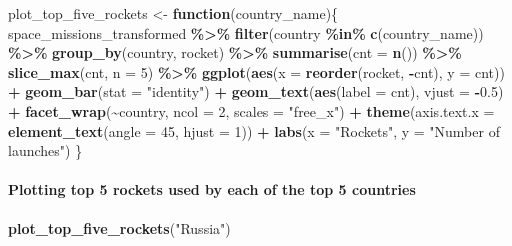 \documentclass[
]{article}
\newenvironment{Shaded}{\begin{snugshade}}{\end{snugshade}}
\newcommand{\AttributeTok}[1]{\textcolor[rgb]{0.13,0.29,0.53}{#1}}
\newcommand{\ControlFlowTok}[1]{\textcolor[rgb]{0.13,0.29,0.53}{\textbf{#1}}}
\newcommand{\DecValTok}[1]{\textcolor[rgb]{0.00,0.00,0.81}{#1}}
\newcommand{\FloatTok}[1]{\textcolor[rgb]{0.00,0.00,0.81}{#1}}
\newcommand{\FunctionTok}[1]{\textcolor[rgb]{0.13,0.29,0.53}{\textbf{#1}}}
\newcommand{\NormalTok}[1]{#1}
\newcommand{\OtherTok}[1]{\textcolor[rgb]{0.56,0.35,0.01}{#1}}
\newcommand{\SpecialCharTok}[1]{\textcolor[rgb]{0.81,0.36,0.00}{\textbf{#1}}}
\newcommand{\StringTok}[1]{\textcolor[rgb]{0.31,0.60,0.02}{#1}}
\begin{document}
\begin{Shaded}
\begin{Highlighting}[]
\NormalTok{plot\_top\_five\_rockets }\OtherTok{\textless{}{-}} \ControlFlowTok{function}\NormalTok{(country\_name)\{}
\NormalTok{  space\_missions\_transformed }\SpecialCharTok{\%\textgreater{}\%}
    \FunctionTok{filter}\NormalTok{(country }\SpecialCharTok{\%in\%} \FunctionTok{c}\NormalTok{(country\_name)) }\SpecialCharTok{\%\textgreater{}\%}
    \FunctionTok{group\_by}\NormalTok{(country, rocket) }\SpecialCharTok{\%\textgreater{}\%}
    \FunctionTok{summarise}\NormalTok{(}\AttributeTok{cnt =} \FunctionTok{n}\NormalTok{()) }\SpecialCharTok{\%\textgreater{}\%} 
    \FunctionTok{slice\_max}\NormalTok{(cnt, }\AttributeTok{n =} \DecValTok{5}\NormalTok{) }\SpecialCharTok{\%\textgreater{}\%} 
    \FunctionTok{ggplot}\NormalTok{(}\FunctionTok{aes}\NormalTok{(}\AttributeTok{x =} \FunctionTok{reorder}\NormalTok{(rocket, }\SpecialCharTok{{-}}\NormalTok{cnt), }\AttributeTok{y =}\NormalTok{ cnt)) }\SpecialCharTok{+}
    \FunctionTok{geom\_bar}\NormalTok{(}\AttributeTok{stat =} \StringTok{"identity"}\NormalTok{) }\SpecialCharTok{+}
    \FunctionTok{geom\_text}\NormalTok{(}\FunctionTok{aes}\NormalTok{(}\AttributeTok{label =}\NormalTok{ cnt), }\AttributeTok{vjust =} \SpecialCharTok{{-}}\FloatTok{0.5}\NormalTok{) }\SpecialCharTok{+}
    \FunctionTok{facet\_wrap}\NormalTok{(}\SpecialCharTok{\textasciitilde{}}\NormalTok{country, }\AttributeTok{ncol =} \DecValTok{2}\NormalTok{, }\AttributeTok{scales =} \StringTok{"free\_x"}\NormalTok{) }\SpecialCharTok{+}
    \FunctionTok{theme}\NormalTok{(}\AttributeTok{axis.text.x =} \FunctionTok{element\_text}\NormalTok{(}\AttributeTok{angle =} \DecValTok{45}\NormalTok{, }\AttributeTok{hjust =} \DecValTok{1}\NormalTok{)) }\SpecialCharTok{+}
    \FunctionTok{labs}\NormalTok{(}\AttributeTok{x =} \StringTok{"Rockets"}\NormalTok{, }\AttributeTok{y =} \StringTok{"Number of launches"}\NormalTok{)}
\NormalTok{\}}
\end{Highlighting}
\end{Shaded}

\hypertarget{plotting-top-5-rockets-used-by-each-of-the-top-5-countries}{%
\paragraph{Plotting top 5 rockets used by each of the top 5
countries}\label{plotting-top-5-rockets-used-by-each-of-the-top-5-countries}}

\begin{Shaded}
\begin{Highlighting}[]
\FunctionTok{plot\_top\_five\_rockets}\NormalTok{(}\StringTok{"Russia"}\NormalTok{)}
\end{Highlighting}
\end{Shaded}
\end{document}
